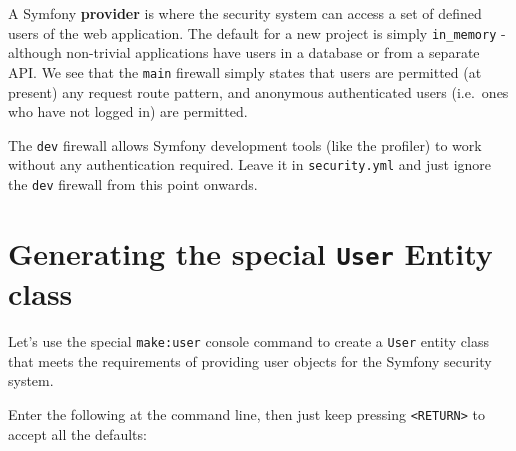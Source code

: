 \documentclass[a4paperpaper,openright]{book}
\begin{document}
A Symfony \textbf{provider} is where the security system can access a
set of defined users of the web application. The default for a new
project is simply \texttt{in\_memory} - although non-trivial
applications have users in a database or from a separate API. We see
that the \texttt{main} firewall simply states that users are permitted
(at present) any request route pattern, and anonymous authenticated
users (i.e.~ones who have not logged in) are permitted.

The \texttt{dev} firewall allows Symfony development tools (like the
profiler) to work without any authentication required. Leave it in
\texttt{security.yml} and just ignore the \texttt{dev} firewall from
this point onwards.

\hypertarget{generating-the-special-user-entity-class}{%
\section{\texorpdfstring{Generating the special \texttt{User} Entity
class}{Generating the special User Entity class}}\label{generating-the-special-user-entity-class}}

Let's use the special \texttt{make:user} console command to create a
\texttt{User} entity class that meets the requirements of providing user
objects for the Symfony security system.

Enter the following at the command line, then just keep pressing
\texttt{\textless{}RETURN\textgreater{}} to accept all the defaults:
\end{document}
